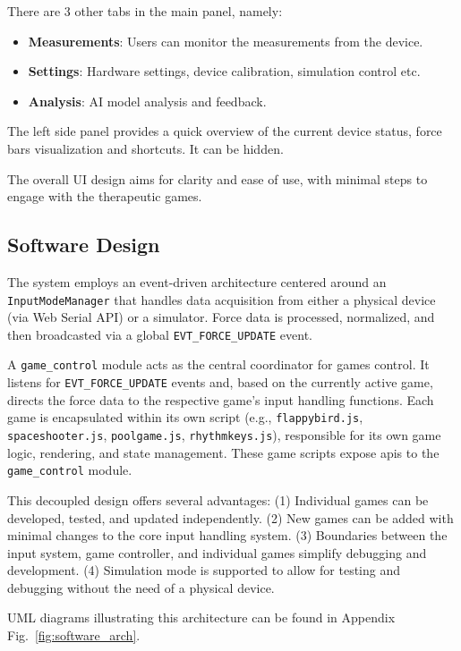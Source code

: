 There are 3 other tabs in the main panel, namely:
\begin{itemize}
    \item \textbf{Measurements}: Users can monitor the measurements from the device.
    \item \textbf{Settings}: Hardware settings, device calibration, simulation control etc.
    \item \textbf{Analysis}: AI model analysis and feedback.
\end{itemize}

The left side panel provides a quick overview of the current device status, force bars visualization and shortcuts. 
It can be hidden.

The overall UI design aims for clarity and ease of use, with minimal steps to engage with the therapeutic games. 

\subsection{Software Design}
The system employs an event-driven architecture centered around an \texttt{InputModeManager} 
that handles data acquisition from either a physical device (via Web Serial API) or a simulator. 
Force data is processed, normalized, and then broadcasted via a global \texttt{EVT\_FORCE\_UPDATE} event.

A \texttt{game\_control} module acts as the central coordinator for games control. 
It listens for \texttt{EVT\_FORCE\_UPDATE} events and, based on the currently active game, 
directs the force data to the respective game's input handling functions. 
Each game is encapsulated within its own script (e.g., \texttt{flappybird.js}, \texttt{spaceshooter.js}, \texttt{poolgame.js}, \texttt{rhythmkeys.js}), 
responsible for its own game logic, rendering, and state management. 
These game scripts expose apis to the \texttt{game\_control} module.

This decoupled design offers several advantages:
(1) Individual games can be developed, tested, and updated independently.
(2) New games can be added with minimal changes to the core input handling system.
(3) Boundaries between the input system, game controller, 
and individual games simplify debugging and development.
(4) Simulation mode is supported to allow for testing and debugging without the need of a physical device.

UML diagrams illustrating this architecture can be found in Appendix Fig.~\ref{fig:software_arch}.

